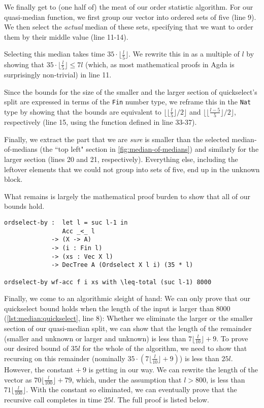 We finally get to (one half of) the meat of our order statistic algorithm. For our quasi-median function, we first group our vector into ordered sets of five (line 9). We then select the \emph{actual} median of these sets, specifying that we want to order them by their middle value (line 11-14).

Selecting this median takes time $35 \cdot \lfloor \frac l 5 \rfloor$. We rewrite this in as a multiple of $l$ by showing that $35 \cdot \lfloor \frac l 5 \rfloor \leq 7 l$ (which, as most mathematical proofs in Agda is surprisingly non-trivial) in line 11.

Since the bounds for the size of the smaller and the larger section of quickselect's split are expressed in terms of the \texttt{Fin} number type, we reframe this in the \texttt{Nat} type by showing that the bounds are equivalent to $\lfloor \lfloor \frac l 5 \rfloor / 2 \rfloor$ and $\lfloor \lfloor \frac {l - 5} 5 \rfloor / 2 \rfloor$, respectively (line 15, using the function defined in line 33-37).

Finally, we extract the part that we are \emph{sure} is smaller than the selected median-of-medians (the ``top left" section in \autoref{fig:median-of-medians}) and similarly for the larger section (lines 20 and 21, respectively). Everything else, including the leftover elements that we could not group into sets of five, end up in the unknown block.

What remains is largely the mathematical proof burden to show that all of our bounds hold.

\begin{lstlisting}[caption={Quickselect (signature)},label={lst:median:quickselect},emph={ordselect,by}]
ordselect-by :  let l = suc l-1 in
                Acc _<_ l
             -> (X -> A)
             -> (i : Fin l)
             -> (xs : Vec X l)
             -> DecTree A (Ordselect X l i) (35 * l)

ordselect-by wf-acc f i xs with \leq-total (suc l-1) 8000
\end{lstlisting}

Finally, we come to an algorithmic sleight of hand: We can only prove that our quickselect bound holds when the length of the input is larger than 8000 (\autoref{lst:median:quickselect}, line 8): Whether we eliminate the larger or the smaller section of our quasi-median split, we can show that the length of the remainder (smaller and unknown or larger and unknown) is less than $7\lfloor\frac l {10}\rfloor + 9$. To prove our desired bound of $35l$ for the whole of the algorithm, we need to show that recursing on this remainder (nominally $35\cdot(7\lfloor\frac l {10} \rfloor + 9)$) is less than $25l$. However, the constant $+~9$ is getting in our way. We can rewrite the length of the vector as $70\lfloor\frac l {100}\rfloor + 79$, which, under the assumption that $l > 800$, is less than $71\lfloor\frac l {100}\rfloor$. With the constant so eliminated, we can eventually prove that the recursive call completes in time $25l$. The full proof is listed below.

